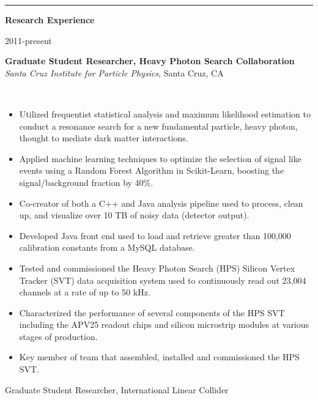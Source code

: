 \documentclass[11pt]{article}
\newcommand{\cvsection}[1] {
    \noindent
    \textcolor{indigodye}{\rule{.15\textwidth}{.1in} \hspace{0.01 \textwidth} \textbf{\Large{#1}}} \newline 
}
\newcommand{\experienceentry}[5] { 
    \noindent
    \begin{minipage}[t]{0.15\textwidth} \begin{flushright} #1 \end{flushright} \end{minipage} \hspace{0.01\textwidth}
    \begin{minipage}[t]{0.84\textwidth} 
        \textbf{#2} \newline
        \emph{#3}, #4 
    \end{minipage} \\[0.01pt]
    #5 \vspace{11pt}
}
\begin{document}
    \cvsection{Research Experience}
        \experienceentry{2011-present}
                        {Graduate Student Researcher, Heavy Photon Search Collaboration}
                        {Santa Cruz Institute for Particle Physics}
                        {Santa Cruz, CA}
                        {   
                            \begin{itemize}[label=\textcolor{indigodye}{$\circ$}, noitemsep, nolistsep, leftmargin=0.19\textwidth]
                              \item Utilized frequentist statistical analysis and maximum likelihood estimation to conduct a 
                                    resonance search for a new fundamental particle, heavy photon, thought to mediate dark matter 
                                    interactions.
                              \item Applied machine learning techniques to optimize the selection of signal like 
                                    events using a Random Forest Algorithm in Scikit-Learn, boosting the 
                                    signal/background fraction by 40\%.
                              \item Co-creator of both a C++ and Java analysis pipeline used to process, clean up,
                                    and visualize over 10 TB of noisy data (detector output).
                              \item Developed Java front end used to load and retrieve greater than 100,000 
                                    calibration constants from a MySQL database.
                              \item Tested and commissioned the Heavy Photon Search (HPS) Silicon Vertex Tracker (SVT) data
                                    acquisition system used to continuously read out 23,004 channels at a rate of up to
                                    50 kHz.
                              \item Characterized the performance of several components of the HPS SVT
                                    including the APV25 readout chips and silicon microstrip modules at various stages
                                    of production.
                              \item Key member of team that assembled, installed and commissioned the HPS SVT.
                          \end{itemize} 
                      } 
                        {Graduate Student Researcher, International Linear Collider}
\end{document}
